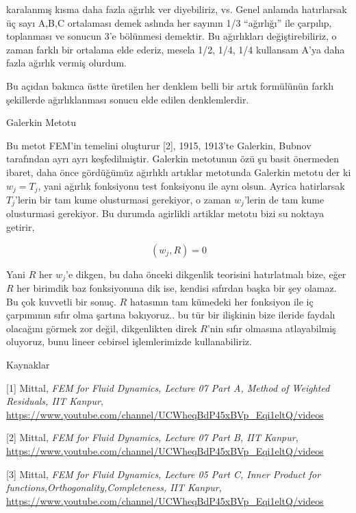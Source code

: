 \documentclass[12pt,fleqn]{article}\usepackage{../../common}
\begin{document}
karalanmış kısma daha fazla ağırlık ver diyebiliriz, vs. Genel anlamda
hatırlarsak üç sayı A,B,C ortalaması demek aslında her sayının 1/3 ``ağırlığı''
ile çarpılıp, toplanması ve sonucun 3'e bölünmesi demektir. Bu ağırlıkları
değiştirebiliriz, o zaman farklı bir ortalama elde ederiz, mesela 1/2, 1/4, 1/4
kullansam A'ya daha fazla ağırlık vermiş olurdum.

Bu açıdan bakınca üstte üretilen her denklem belli bir artık formülünün
farklı şekillerde ağırlıklanması sonucu elde edilen denklemlerdir.

Galerkin Metotu

Bu metot FEM'in temelini oluşturur [2], 1915, 1913'te Galerkin, Bubnov
tarafından ayrı ayrı keşfedilmiştir. Galerkin metotunun özü şu basit önermeden
ibaret, daha önce gördüğümüz ağırlıklı artıklar metotunda Galerkin metotu der ki
$w_j = T_j$, yani ağırlık fonksiyonu test fonksiyonu ile aynı olsun. Ayrica
hatirlarsak $T_j$'lerin bir tam kume olusturmasi gerekiyor, o zaman $w_j$'lerin
de tam kume olusturmasi gerekiyor. Bu durumda agirlikli artiklar metotu bizi su
noktaya getirir,

$$
(w_j,R) = 0
$$

Yani $R$ her $w_j$'e dikgen, bu daha önceki dikgenlik teorisini hatırlatmalı
bize, eğer $R$ her birimdik baz fonksiyonuna dik ise, kendisi sıfırdan başka bir
şey olamaz. Bu çok kuvvetli bir sonuç. $R$ hatasının tam kümedeki her fonksiyon
ile iç çarpımının sıfır olma şartına bakıyoruz.. bu tür bir ilişkinin bize
ileride faydalı olacağını görmek zor değil, dikgenlikten direk $R$'nin sıfır
olmasına atlayabilmiş oluyoruz, bunu lineer cebirsel işlemlerimizde
kullanabiliriz.

Kaynaklar

[1] Mittal, {\em FEM for Fluid Dynamics, Lecture 07 Part A, Method of Weighted Residuals, IIT Kanpur},
    \url{https://www.youtube.com/channel/UCWheqBdP45xBVp_Eqi1eltQ/videos}

[2] Mittal, {\em FEM for Fluid Dynamics, Lecture 07 Part B, IIT Kanpur},
    \url{https://www.youtube.com/channel/UCWheqBdP45xBVp_Eqi1eltQ/videos}

[3] Mittal, {\em FEM for Fluid Dynamics, Lecture 05 Part C, Inner Product for functions,Orthogonality,Completeness, IIT Kanpur},
    \url{https://www.youtube.com/channel/UCWheqBdP45xBVp_Eqi1eltQ/videos}


    
\end{document}
